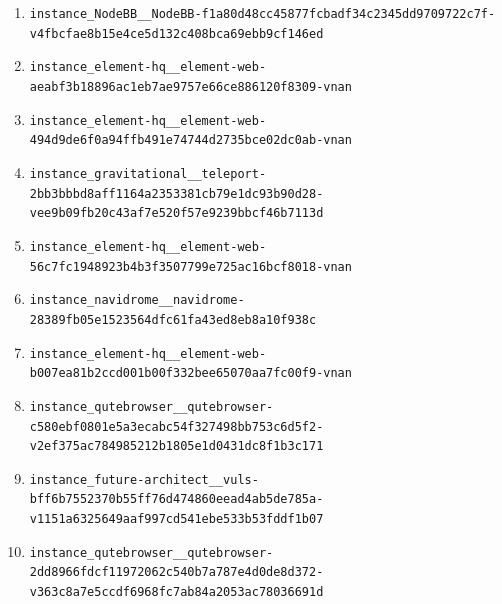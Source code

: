 \begin{enumerate}
\item \texttt{instance\_\allowbreak{}NodeBB\_\allowbreak{}\_\allowbreak{}NodeBB-\allowbreak{}f1a80d48cc4587\allowbreak{}7fcbadf34c2345\allowbreak{}dd9709722c7f-\allowbreak{}v4fbcfae8b15e4\allowbreak{}ce5d132c408bca\allowbreak{}69ebb9cf146ed}
\item \texttt{instance\_\allowbreak{}element-\allowbreak{}hq\_\allowbreak{}\_\allowbreak{}element-\allowbreak{}web-\allowbreak{}aeabf3b18896ac\allowbreak{}1eb7ae9757e66c\allowbreak{}e886120f8309-\allowbreak{}vnan}
\item \texttt{instance\_\allowbreak{}element-\allowbreak{}hq\_\allowbreak{}\_\allowbreak{}element-\allowbreak{}web-\allowbreak{}494d9de6f0a94f\allowbreak{}fb491e74744d27\allowbreak{}35bce02dc0ab-\allowbreak{}vnan}
\item \texttt{instance\_\allowbreak{}gravitational\_\allowbreak{}\_\allowbreak{}teleport-\allowbreak{}2bb3bbbd8aff11\allowbreak{}64a2353381cb79\allowbreak{}e1dc93b90d28-\allowbreak{}vee9b09fb20c43\allowbreak{}af7e520f57e923\allowbreak{}9bbcf46b7113d}
\item \texttt{instance\_\allowbreak{}element-\allowbreak{}hq\_\allowbreak{}\_\allowbreak{}element-\allowbreak{}web-\allowbreak{}56c7fc1948923b\allowbreak{}4b3f3507799e72\allowbreak{}5ac16bcf8018-\allowbreak{}vnan}
\item \texttt{instance\_\allowbreak{}navidrome\_\allowbreak{}\_\allowbreak{}navidrome-\allowbreak{}28389fb05e1523\allowbreak{}564dfc61fa43ed\allowbreak{}8eb8a10f938c}
\item \texttt{instance\_\allowbreak{}element-\allowbreak{}hq\_\allowbreak{}\_\allowbreak{}element-\allowbreak{}web-\allowbreak{}b007ea81b2ccd0\allowbreak{}01b00f332bee65\allowbreak{}070aa7fc00f9-\allowbreak{}vnan}
\item \texttt{instance\_\allowbreak{}qutebrowser\_\allowbreak{}\_\allowbreak{}qutebrowser-\allowbreak{}c580ebf0801e5a\allowbreak{}3ecabc54f32749\allowbreak{}8bb753c6d5f2-\allowbreak{}v2ef375ac78498\allowbreak{}5212b1805e1d04\allowbreak{}31dc8f1b3c171}
\item \texttt{instance\_\allowbreak{}future-\allowbreak{}architect\_\allowbreak{}\_\allowbreak{}vuls-\allowbreak{}bff6b7552370b5\allowbreak{}5ff76d474860ee\allowbreak{}ad4ab5de785a-\allowbreak{}v1151a6325649a\allowbreak{}af997cd541ebe5\allowbreak{}33b53fddf1b07}
\item \texttt{instance\_\allowbreak{}qutebrowser\_\allowbreak{}\_\allowbreak{}qutebrowser-\allowbreak{}2dd8966fdcf119\allowbreak{}72062c540b7a78\allowbreak{}7e4d0de8d372-\allowbreak{}v363c8a7e5ccdf\allowbreak{}6968fc7ab84a20\allowbreak{}53ac78036691d}

\end{enumerate}

